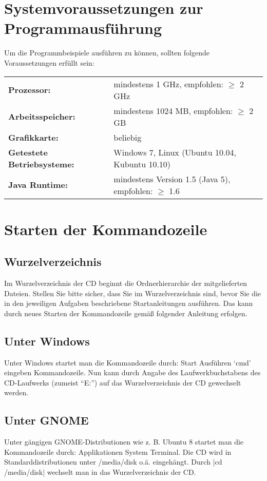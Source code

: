 \documentclass[a4paper,10pt,notitlepage]{scrreprt}
\begin{document}
\section{Systemvoraussetzungen zur Programmausführung}
\label{Vor}
Um die Programmbeispiele ausführen zu können, sollten folgende Voraussetzungen erfüllt sein:\\

 \begin{tabular}{ll}
  \textbf{Prozessor:}                & mindestens 1 GHz, empfohlen: $\geq$ 2 GHz \\
  \textbf{Arbeitsspeicher:}          & mindestens 1024 MB, empfohlen: $\geq$ 2 GB \\
  \textbf{Grafikkarte:}              & beliebig \\
  \textbf{Getestete Betriebsysteme:} & Windows 7, Linux (Ubuntu 10.04, Kubuntu 10.10) \\
  \textbf{Java Runtime:}             & mindestens Version 1.5 (Java 5), empfohlen: $\geq$ 1.6 \\
 \end{tabular}
\section{Starten der Kommandozeile}
\subsection{Wurzelverzeichnis}
 Im Wurzelverzeichnis der CD beginnt die Ordnerhierarchie der mitgelieferten Dateien.
 Stellen Sie bitte sicher, dass Sie im Wurzelverzeichnis sind, bevor Sie die in den jeweiligen Aufgaben beschriebene Startanleitungen ausführen.
 Das kann durch neues Starten der Kommandozeile gemäß folgender Anleitung erfolgen.
\newcommand{\then}{\textrightarrow{} }
\subsection{Unter Windows}
 Unter Windows startet man die Kommandozeile durch: Start \then Ausführen \then `cmd' eingeben \then Kommandozeile.
 Nun kann durch Angabe des Laufwerkbuchstabens des CD-Laufwerks (zumeist ``E:'') auf das Wurzelverzeichnis der CD gewechselt werden.
\subsection{Unter GNOME}
 Unter gängigen GNOME-Distributionen wie z. B. Ubuntu 8 startet man die Kommandozeile durch:
 Applikationen \then System \then Terminal.
 Die CD wird in Standarddistributionen unter /media/disk o.ä. eingehängt. Durch |cd /media/disk| wechselt man in das Wurzelverzeichnis der CD.
\end{document}
